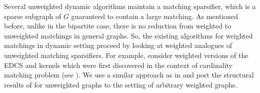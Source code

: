 Several unweighted dynamic algorithms maintain a matching sparsifier, which is a sparse subgraph of $G$ guaranteed to contain a large matching. As mentioned before, unlike in the bipartite case, there is no reduction from weighted to unweighted matchings in general graphs. So, the existing algorithms for weighted matchings in dynamic setting proceed by looking at weighted analogues of unweighted matching sparsifiers. For example, \cite{BernsteinDL21} consider weighted versions of the EDCS and kernels which were first discovered in the context of cardinality matching problem (see \cite{BS15,BS16,BHI15}). We use a similar approach as in \cite{BernsteinDL21} and port the structural results of \cite{AssadiBD22} for unweighted graphs to the setting of arbitrary weighted graphs. 





